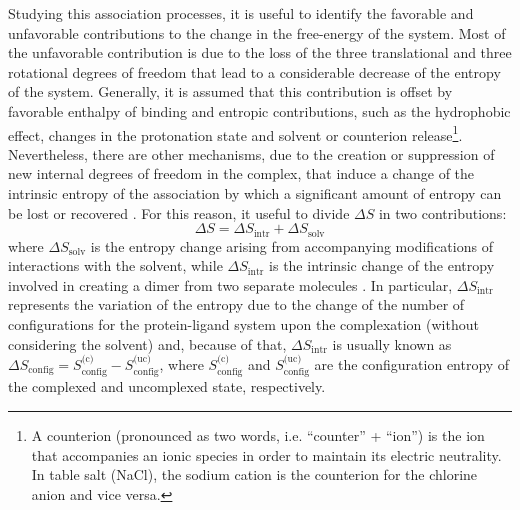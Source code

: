Studying this association processes, it is useful to identify the favorable and unfavorable contributions to the change in the free-energy of the system. Most of the unfavorable contribution is due to the loss of the three translational and three rotational degrees of freedom that lead to a considerable decrease of the entropy of the system. Generally, it is assumed that this contribution is offset by favorable enthalpy of binding and entropic contributions, such as the hydrophobic effect, changes in the protonation state and solvent or counterion release\footnote{
A counterion (pronounced as two words, i.e. ``counter'' + ``ion'') is the ion that accompanies an ionic species in order to maintain its electric neutrality. In table salt (NaCl), the sodium cation is the counterion for the chlorine anion and vice versa.}. 
Nevertheless, there are other mechanisms, due to the creation or suppression of new internal degrees of freedom in the complex, that induce a change of the intrinsic entropy of the association by which a significant amount of entropy can be lost or recovered 
\cite{tidor1994contribution}. 
For this reason, it useful to divide $\Delta S$ in two contributions:
\begin{equation*}
\label{entropy-variation:total}
\Delta S = \Delta S_\text{intr} + \Delta S_\text{solv}
\end{equation*}
where $\Delta S_\text{solv}$ is the entropy change arising from accompanying modifications of interactions with the solvent, while $\Delta S_\text{intr}$ is the intrinsic change of the entropy involved in creating a dimer from two separate molecules \cite{steinberg1963entropy}. In particular, $\Delta S_\text{intr}$ represents the variation of the entropy due to the change of the number of configurations for the protein-ligand system upon the complexation (without considering the solvent) and, because of that, $\Delta S_\text{intr}$ is usually known as $\Delta S_\text{config} = S_\text{config}^\text{(c)} - S_\text{config}^\text{(uc)}$, where $S_\text{config}^\text{(c)}$ and $S_\text{config}^\text{(uc)}$ are the configuration entropy of the complexed and uncomplexed state, respectively. 


